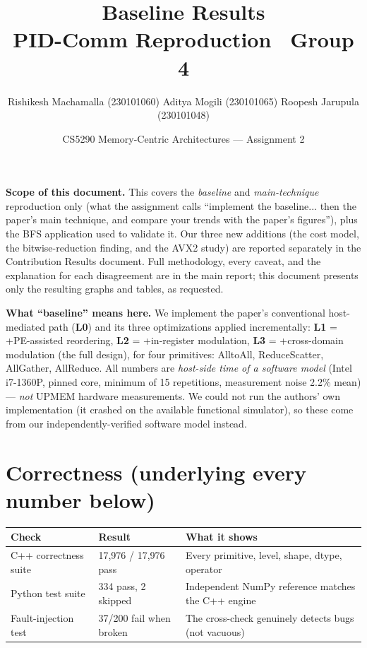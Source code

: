 \documentclass[11pt]{article}
\title{\vspace{-1.5em}Baseline Results\\\large PID-Comm Reproduction \textemdash\ Group 4}
\author{Rishikesh Machamalla (230101060) \quad Aditya Mogili (230101065) \quad Roopesh Jarupula (230101048)}
\date{CS5290 Memory-Centric Architectures --- Assignment 2}
\begin{document}
\maketitle
\vspace{-1.5em}

\noindent\textbf{Scope of this document.} This covers the \emph{baseline} and \emph{main-technique} reproduction only (what the assignment calls ``implement the baseline... then the paper's main technique, and compare your trends with the paper's figures''), plus the BFS application used to validate it. Our three new additions (the cost model, the bitwise-reduction finding, and the AVX2 study) are reported separately in the Contribution Results document. Full methodology, every caveat, and the explanation for each disagreement are in the main report; this document presents only the resulting graphs and tables, as requested.

\textbf{What ``baseline'' means here.} We implement the paper's conventional host-mediated path (\textbf{L0}) and its three optimizations applied incrementally: \textbf{L1} = +PE-assisted reordering, \textbf{L2} = +in-register modulation, \textbf{L3} = +cross-domain modulation (the full design), for four primitives: AlltoAll, ReduceScatter, AllGather, AllReduce. All numbers are \emph{host-side time of a software model} (Intel i7-1360P, pinned core, minimum of 15 repetitions, measurement noise 2.2\% mean) --- \emph{not} UPMEM hardware measurements. We could not run the authors' own implementation (it crashed on the available functional simulator), so these come from our independently-verified software model instead.

\section{Correctness (underlying every number below)}
\begin{center}\small
\begin{tabular}{@{}lll@{}}\toprule
Check & Result & What it shows \\\midrule
C++ correctness suite & 17{,}976 / 17{,}976 pass & Every primitive, level, shape, dtype, operator \\
Python test suite & 334 pass, 2 skipped & Independent NumPy reference matches the C++ engine \\
Fault-injection test & 37/200 fail when broken & The cross-check genuinely detects bugs (not vacuous) \\
\bottomrule
\end{tabular}
\end{center}
\end{document}
